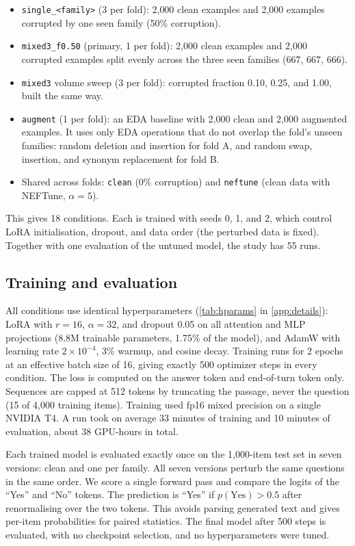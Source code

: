 \documentclass[11pt]{article}
\newcommand{\condn}[1]{\texttt{#1}}
\begin{document}
\begin{itemize}
  \item \condn{single\_<family>} (3 per fold): 2{,}000 clean examples and 2{,}000 examples corrupted by one seen family (50\% corruption).
  \item \condn{mixed3\_f0.50} (primary, 1 per fold): 2{,}000 clean examples and 2{,}000 corrupted examples split evenly across the three seen families (667, 667, 666).
  \item \condn{mixed3} volume sweep (3 per fold): corrupted fraction 0.10, 0.25, and 1.00, built the same way.
  \item \condn{augment} (1 per fold): an EDA baseline \citep{wei2019eda} with 2{,}000 clean and 2{,}000 augmented examples. It uses only EDA operations that do not overlap the fold's unseen families: random deletion and insertion for fold A, and random swap, insertion, and synonym replacement for fold B.
  \item Shared across folds: \condn{clean} (0\% corruption) and \condn{neftune} (clean data with NEFTune, $\alpha{=}5$).
\end{itemize}

This gives 18 conditions. Each is trained with seeds 0, 1, and 2, which control LoRA initialisation, dropout, and data order (the perturbed data is fixed). Together with one evaluation of the untuned model, the study has 55 runs.

\subsection{Training and evaluation}

All conditions use identical hyperparameters (\cref{tab:hparams} in \cref{app:details}): LoRA with $r{=}16$, $\alpha{=}32$, and dropout 0.05 on all attention and MLP projections (8.8M trainable parameters, 1.75\% of the model), and AdamW with learning rate $2\times10^{-4}$, 3\% warmup, and cosine decay. Training runs for 2 epochs at an effective batch size of 16, giving exactly 500 optimizer steps in every condition. The loss is computed on the answer token and end-of-turn token only. Sequences are capped at 512 tokens by truncating the passage, never the question (15 of 4{,}000 training items). Training used fp16 mixed precision on a single NVIDIA T4. A run took on average 33 minutes of training and 10 minutes of evaluation, about 38 GPU-hours in total.

Each trained model is evaluated exactly once on the 1{,}000-item test set in seven versions: clean and one per family. All seven versions perturb the same questions in the same order. We score a single forward pass and compare the logits of the ``Yes'' and ``No'' tokens. The prediction is ``Yes'' if $p(\text{Yes}) > 0.5$ after renormalising over the two tokens. This avoids parsing generated text and gives per-item probabilities for paired statistics. The final model after 500 steps is evaluated, with no checkpoint selection, and no hyperparameters were tuned.
\end{document}
